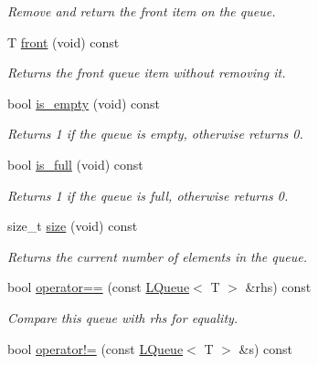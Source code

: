\begin{DoxyCompactItemize}
\begin{DoxyCompactList}\small\item\em Remove and return the front item on the queue. \item\end{DoxyCompactList}\item 
T \hyperlink{classMadara_1_1Utility_1_1LQueue_a5a4dc5099d2d86d5881f3e369e5e7626}{front} (void) const 
\begin{DoxyCompactList}\small\item\em Returns the front queue item without removing it. \item\end{DoxyCompactList}\item 
bool \hyperlink{classMadara_1_1Utility_1_1LQueue_a6e0919d30fdb1e200525318b30b46b01}{is\_\-empty} (void) const 
\begin{DoxyCompactList}\small\item\em Returns 1 if the queue is empty, otherwise returns 0. \item\end{DoxyCompactList}\item 
bool \hyperlink{classMadara_1_1Utility_1_1LQueue_afc5bb8161fcfd3f283bc00dccce0e36f}{is\_\-full} (void) const 
\begin{DoxyCompactList}\small\item\em Returns 1 if the queue is full, otherwise returns 0. \item\end{DoxyCompactList}\item 
size\_\-t \hyperlink{classMadara_1_1Utility_1_1LQueue_a384f044373b5fadd8ad2ee7a7f94b741}{size} (void) const 
\begin{DoxyCompactList}\small\item\em Returns the current number of elements in the queue. \item\end{DoxyCompactList}\item 
bool \hyperlink{classMadara_1_1Utility_1_1LQueue_a4e71c42df83e2790692d0674dc43b577}{operator==} (const \hyperlink{classMadara_1_1Utility_1_1LQueue}{LQueue}$<$ T $>$ \&rhs) const 
\begin{DoxyCompactList}\small\item\em Compare this queue with {\itshape rhs\/} for equality. \item\end{DoxyCompactList}\item 
bool \hyperlink{classMadara_1_1Utility_1_1LQueue_a80798044b7d5cd4fdb00e1a25bfe195d}{operator!=} (const \hyperlink{classMadara_1_1Utility_1_1LQueue}{LQueue}$<$ T $>$ \&s) const 

\end{DoxyCompactItemize}
